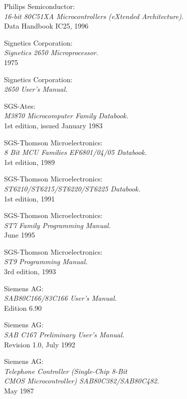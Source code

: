  Philips Semiconductor: \\
                 {\em 16-bit 80C51XA Microcontrollers (eXtended
                  Architecture).\/} \\
                 Data Handbook IC25, 1996

 Signetics Corporation: \\
                 {\em Signetics 2650 Microprocessor.} \\
                 1975

 Signetics Corporation: \\
                 {\em 2650 User's Manual.}

 SGS-Ates: \\
                 {\em M3870 Microcomputer Family Databook.\/}\\
                 1st edition, issued January 1983

 SGS-Thomson Microelectronics: \\
                {\em 8 Bit MCU Families EF6801/04/05 Databook.\/}\\
                1st edition, 1989

 SGS-Thomson Microelectronics: \\
                {\em ST6210/ST6215/ST6220/ST6225 Databook.\/} \\
                1st edition, 1991

 SGS-Thomson Microelectronics: \\
                 {\em ST7 Family Programming Manual.\/} \\
                 June 1995

 SGS-Thomson Microelectronics: \\
               {\em ST9 Programming Manual.\/} \\
               3rd edition, 1993

 Siemens AG: \\
                  {\em SAB80C166/83C166 User's Manual.\/} \\
                  Edition 6.90

 Siemens AG: \\
                  {\em SAB C167 Preliminary User's Manual.\/} \\
                  Revision 1.0, July 1992

 Siemens AG: \\
                  {\em Telephone Controller (Single-Chip 8-Bit \\
                  CMOS Microcontroller) SAB80C382/SAB80C482.\/}\\
                  May 1987


